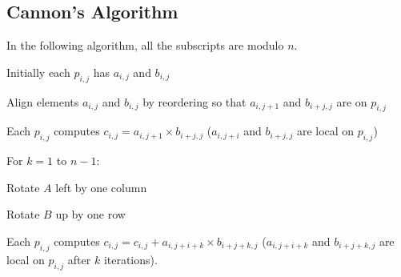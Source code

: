 \documentclass[]{scrartcl}
\begin{document}
\subsection{Cannon's Algorithm}
In the following algorithm, all the subscripts are modulo $n$.
\begin{enumerate}
	\item Initially each $p_{i,j}$ has $a_{i,j}$ and $b_{i,j}$
	\item Align elements $a_{i,j}$ and $b_{i,j}$ by reordering so that $a_{i,j+1}$ and $b_{i+j,j}$ are on $p_{i,j}$
	\item Each $p_{i,j}$ computes $c_{i,j}=a_{i,j+1}\times b_{i+j,j}$ ($a_{i,j+i}$ and $b_{i+j,j}$ are local on $p_{i,j}$)
	\item For $k=1$ to $n-1$:
	{\setlength\itemindent{25pt} \item Rotate $A$ left by one column}
	{\setlength\itemindent{25pt} \item Rotate $B$ up by one row}
	{\setlength\itemindent{25pt} \item Each $p_{i,j}$ computes $c_{i,j}=c_{i,j}+a_{i,j+i+k} \times b_{i+j+k,j}$ ($a_{i,j+i+k}$ and $b_{i+j+k,j}$ are local on $p_{i,j}$ after $k$ iterations).}
	
\end{enumerate}
\end{document}
